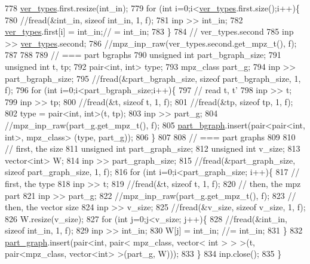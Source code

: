 \begin{DoxyCode}
778   \hyperlink{classmarked__graph__compressed_af446cc5e23c241a92b76642fd5ebc403}{ver\_types}.first.resize(int\_in);
779   \textcolor{keywordflow}{for} (\textcolor{keywordtype}{int} i=0;i<\hyperlink{classmarked__graph__compressed_af446cc5e23c241a92b76642fd5ebc403}{ver\_types}.first.size();i++)\{
780     \textcolor{comment}{//fread(&int\_in, sizeof int\_in, 1, f);}
781     inp >> int\_in;
782     \hyperlink{classmarked__graph__compressed_af446cc5e23c241a92b76642fd5ebc403}{ver\_types}.first[i] = int\_in;\textcolor{comment}{// = int\_in;}
783   \}
784   \textcolor{comment}{// ver\_types.second}
785   inp >> \hyperlink{classmarked__graph__compressed_af446cc5e23c241a92b76642fd5ebc403}{ver\_types}.second;
786   \textcolor{comment}{//mpz\_inp\_raw(ver\_types.second.get\_mpz\_t(), f);}
787 
788 
789   \textcolor{comment}{// === part bgraphs}
790   \textcolor{keywordtype}{unsigned} \textcolor{keywordtype}{int} part\_bgraph\_size;
791   \textcolor{keywordtype}{unsigned} \textcolor{keywordtype}{int} t, tp;
792   pair<int, int> type; 
793   mpz\_class part\_g;
794   inp >> part\_bgraph\_size;
795   \textcolor{comment}{//fread(&part\_bgraph\_size, sizeof part\_bgraph\_size, 1, f);}
796   \textcolor{keywordflow}{for} (\textcolor{keywordtype}{int} i=0;i<part\_bgraph\_size;i++)\{
797     \textcolor{comment}{// read t, t'}
798     inp >> t;
799     inp >> tp;
800     \textcolor{comment}{//fread(&t, sizeof t, 1, f);}
801     \textcolor{comment}{//fread(&tp, sizeof tp, 1, f);}
802     type = pair<int, int>(t, tp);
803     inp >> part\_g;
804     \textcolor{comment}{//mpz\_inp\_raw(part\_g.get\_mpz\_t(), f);}
805     \hyperlink{classmarked__graph__compressed_a7b3267063fba30b45eb21b3ba4e07536}{part\_bgraph}.insert(pair<pair<int, int>, mpz\_class> (type, part\_g));
806   \}
807 
808   \textcolor{comment}{// === part graphs}
809 
810   \textcolor{comment}{// first, the size}
811   \textcolor{keywordtype}{unsigned} \textcolor{keywordtype}{int} part\_graph\_size;
812   \textcolor{keywordtype}{unsigned} \textcolor{keywordtype}{int} v\_size;
813   vector<int> W; 
814   inp >> part\_graph\_size;
815   \textcolor{comment}{//fread(&part\_graph\_size, sizeof part\_graph\_size, 1, f);}
816   \textcolor{keywordflow}{for} (\textcolor{keywordtype}{int} i=0;i<part\_graph\_size; i++)\{
817     \textcolor{comment}{// first, the type}
818     inp >> t; 
819     \textcolor{comment}{//fread(&t, sizeof t, 1, f);}
820     \textcolor{comment}{// then, the mpz part}
821     inp >> part\_g;
822     \textcolor{comment}{//mpz\_inp\_raw(part\_g.get\_mpz\_t(), f);}
823     \textcolor{comment}{// then, the vector size}
824     inp >> v\_size;
825     \textcolor{comment}{//fread(&v\_size, sizeof v\_size, 1, f);}
826     W.resize(v\_size);
827     \textcolor{keywordflow}{for} (\textcolor{keywordtype}{int} j=0;j<v\_size; j++)\{
828       \textcolor{comment}{//fread(&int\_in, sizeof int\_in, 1, f);}
829       inp >> int\_in;
830       W[j] = int\_in; \textcolor{comment}{//= int\_in;}
831     \}
832     \hyperlink{classmarked__graph__compressed_ae179a4737e6eab905c18a94d44ef64b7}{part\_graph}.insert(pair<\textcolor{keywordtype}{int}, pair< mpz\_class, vector< int > > >(t, pair<mpz\_class, vector<int>
       >(part\_g, W)));
833   \}
834   inp.close();
835 \}
\end{DoxyCode}
